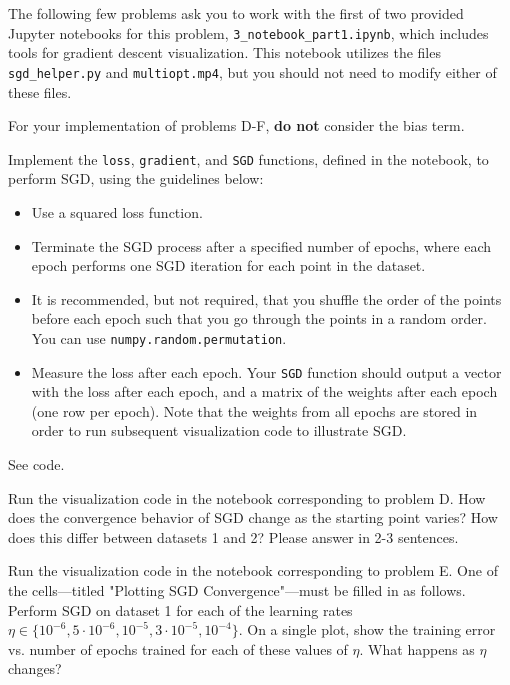 The following few problems ask you to work with the first of two provided Jupyter notebooks for this problem, \texttt{3_notebook_part1.ipynb}, which includes tools for gradient descent visualization. This notebook utilizes the files \texttt{sgd_helper.py} and \texttt{multiopt.mp4}, but you should not need to modify either of these files. 

For your implementation of problems D-F, \textbf{do not} consider the bias term.

\begin{problem}[6]
  Implement the \texttt{loss}, \texttt{gradient}, and \texttt{SGD} functions, defined in the notebook, to perform SGD, using the guidelines below:

  \begin{itemize}
    \item Use a squared loss function.
    \item Terminate the SGD process after a specified number of epochs, where each epoch performs one SGD iteration for each point in the dataset.
    \item It is recommended, but not required, that you shuffle the order of the points before each epoch such that you go through the points in a random order. You can use \texttt{numpy.random.permutation}.
    \item Measure the loss after each epoch. Your \texttt{SGD} function should output a vector with the loss after each epoch, and a matrix of the weights after each epoch (one row per epoch). Note that the weights from all epochs are stored in order to run subsequent visualization code to illustrate SGD.
  \end{itemize}
\end{problem}
\begin{solution}
See code. %
\end{solution}

\begin{problem}[2]
  Run the visualization code in the notebook corresponding to problem D. How does the convergence behavior of SGD change as the starting point varies? How does this differ between datasets 1 and 2? Please answer in 2-3 sentences.
\end{problem}
\begin{solution}

\end{solution}

\begin{problem}[6]
  Run the visualization code in the notebook corresponding to problem E. One of the cells---titled "Plotting SGD Convergence"---must be filled in as follows. Perform SGD on dataset 1 for each of the learning rates $\eta \in \{10^{-6}, 5 \cdot 10^{-6}, 10^{-5}, 3 \cdot 10^{-5}, 10^{-4}\}$. On a single plot, show the training error vs. number of epochs trained for each of these values of $\eta$. What happens as $\eta$ changes?
\end{problem}

